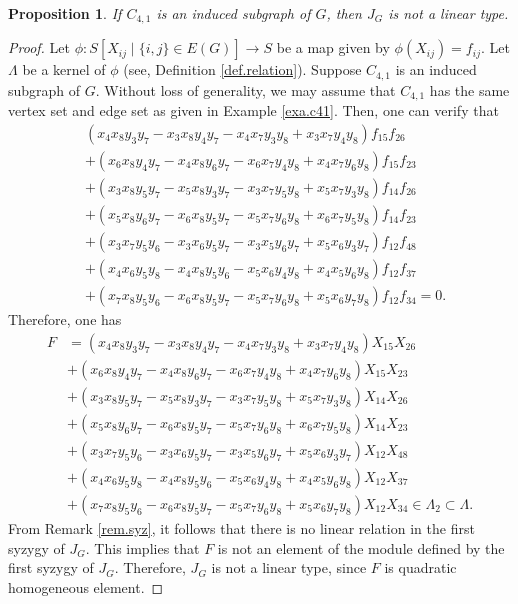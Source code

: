 \documentclass[11pt,a4paper,reqno]{amsart}
\newtheorem{proposition}[theorem]{Proposition}
\theoremstyle{definition}
\begin{document}
\begin{proposition} \label{prop.counter}
    If $C_{4,1}$ is an induced subgraph of $G$, then $J_G$ is not a linear type.
\end{proposition}
\begin{proof}
    Let $\phi: S[X_{ij} \mid \{i,j\} \in E(G)] \rightarrow S$ be a map given by $\phi(X_{ij})=f_{ij}$. Let $\Lambda$ be a kernel of $\phi$ (see, Definition \ref{def.relation}). Suppose  $C_{4,1}$ is an induced subgraph of $G$. Without loss of generality, we may assume that $C_{4,1}$ has the same vertex set and edge set as given in Example \ref{exa.c41}. Then, one can verify that
    \begin{equation} \label{eq.qudratic}
        \begin{split}
            &(x_4x_8y_3y_7-x_3x_8y_4y_7-x_4x_7y_3y_8+x_3x_7y_4y_8)f_{15}f_{26}\\
            &+(x_6x_8y_4y_7-x_4x_8y_6y_7-x_6x_7y_4y_8+x_4x_7y_6y_8)f_{15}f_{23}\\
            &+(x_3x_8y_5y_7-x_5x_8y_3y_7-x_3x_7y_5y_8+x_5x_7y_3y_8)f_{14}f_{26}\\
            &+(x_5x_8y_6y_7-x_6x_8y_5y_7-x_5x_7y_6y_8+x_6x_7y_5y_8)f_{14}f_{23}\\
            &+(x_3x_7y_5y_6-x_3x_6y_5y_7-x_3x_5y_6y_7+x_5x_6y_3y_7)f_{12}f_{48}\\
            &+(x_4x_6y_5y_8-x_4x_8y_5y_6-x_5x_6y_4y_8+x_4x_5y_6y_8)f_{12}f_{37}\\
            &+(x_7x_8y_5y_6-x_6x_8y_5y_7-x_5x_7y_6y_8+x_5x_6y_7y_8)f_{12}f_{34} = 0.
        \end{split}
    \end{equation}
    Therefore, one has 
    \begin{equation*}
    \begin{split}
        F &= (x_4x_8y_3y_7-x_3x_8y_4y_7-x_4x_7y_3y_8+x_3x_7y_4y_8)X_{15}X_{26}\\
            &+(x_6x_8y_4y_7-x_4x_8y_6y_7-x_6x_7y_4y_8+x_4x_7y_6y_8)X_{15}X_{23}\\
            &+(x_3x_8y_5y_7-x_5x_8y_3y_7-x_3x_7y_5y_8+x_5x_7y_3y_8)X_{14}X_{26}\\
            &+(x_5x_8y_6y_7-x_6x_8y_5y_7-x_5x_7y_6y_8+x_6x_7y_5y_8)X_{14}X_{23}\\
            &+(x_3x_7y_5y_6-x_3x_6y_5y_7-x_3x_5y_6y_7+x_5x_6y_3y_7)X_{12}X_{48}\\
            &+(x_4x_6y_5y_8-x_4x_8y_5y_6-x_5x_6y_4y_8+x_4x_5y_6y_8)X_{12}X_{37}\\
            &+(x_7x_8y_5y_6-x_6x_8y_5y_7-x_5x_7y_6y_8+x_5x_6y_7y_8)X_{12}X_{34} \in \Lambda_2 \subset \Lambda.
    \end{split}
    \end{equation*}
    From Remark \ref{rem.syz}, it follows that there is no linear relation in the first syzygy of $J_G$. This implies that $F$ is not an element of the module defined by the first syzygy of $J_G$. Therefore, $J_G$ is not a linear type, since $F$ is quadratic homogeneous element.
\end{proof}
\end{document}
